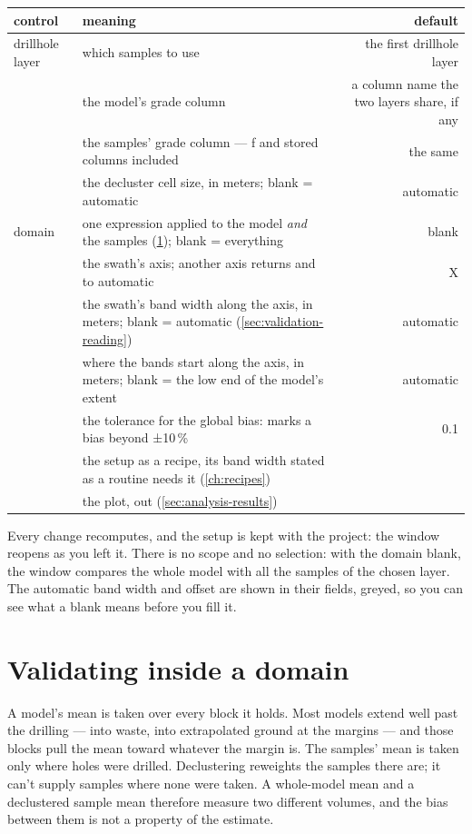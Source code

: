 \medskip
\begin{tabularx}{\linewidth}{@{}lMD@{}}\toprule
control & meaning & default \\ \midrule
drillhole layer & which samples to use & the first drillhole layer \\
 & the model's grade column & a column name the two layers share, if any \\
 & the samples' grade column — ƒ and stored columns included & the same \\
 & the decluster cell size, in meters; blank = automatic & automatic \\
domain & one expression applied to the model \emph{and} the samples (\cref{sec:validation-domain}); blank = everything & blank \\
   & the swath's axis; another axis returns  and  to automatic & X \\
 & the swath's band width along the axis, in meters; blank = automatic (\cref{sec:validation-reading}) & automatic \\
 & where the bands start along the axis, in meters; blank = the low end of the model's extent & automatic \\
 & the tolerance for the global bias:  marks a bias beyond ±10\,\% & 0.1 \\
 & the setup as a recipe, its band width stated as a routine needs it (\cref{ch:recipes}) & \\
   & the plot, out (\cref{sec:analysis-results}) & \\ \bottomrule
\end{tabularx}
\medskip

Every change recomputes, and the setup is kept with the project: the window reopens as you left it. There is no scope and no selection: with the domain blank, the window compares the whole model with all the samples of the chosen layer. The automatic band width and offset are shown in their fields, greyed, so you can see what a blank means before you fill it.

\section{Validating inside a domain}\label{sec:validation-domain}
A model's mean is taken over every block it holds. Most models extend well past the drilling — into waste, into extrapolated ground at the margins — and those blocks pull the mean toward whatever the margin is. The samples' mean is taken only where holes were drilled. Declustering reweights the samples there are; it can't supply samples where none were taken. A whole-model mean and a declustered sample mean therefore measure two different volumes, and the bias between them is not a property of the estimate.

